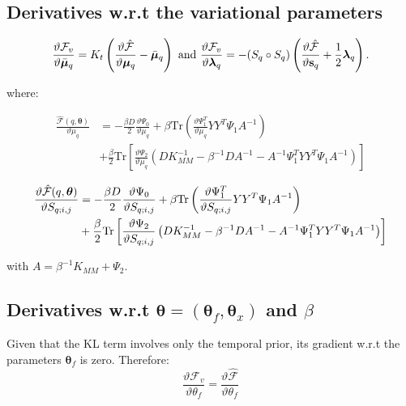 \subsection{Derivatives w.r.t the variational parameters}
\begin{equation}
    \label{derivVarParamSuppl}
\frac{\vartheta \mathcal{F}_v}{\vartheta \bar{\boldsymbol \mu}_q} 
=  K_t \left( \frac{\vartheta \hat{\mathcal{F}}}{\vartheta \boldsymbol \mu_q} - \bar{\boldsymbol \mu}_q \right)
\text{ and }
 \frac{\vartheta \mathcal{F}_v}{\vartheta \boldsymbol \lambda_q}
= - ( S_q \circ S_q) \left( \frac{\vartheta \hat{\mathcal{F}}}{\vartheta \mathbf{s}_q} + \frac{1}{2} \boldsymbol \lambda_q \right).
\end{equation}

where:

\begin{align}
 \frac{\hat{\mathcal{F}}(q, \boldsymbol \theta)}{\vartheta \mu_q}
{}& = - \frac{\beta D}{2} \frac{\vartheta \Psi_0}{\vartheta \mu_q}
    + \beta \text{Tr} \left(\frac{\vartheta \Psi_1^T}{\vartheta \mu_q} Y Y^T \Psi_1 A^{-1} \right) \nonumber \\
{}& + \frac{\beta}{2} \text{Tr} \left[ \frac{\vartheta \Psi_2}{\vartheta \mu_q}
       \left(
	  D K_{MM}^{-1} - \beta^{-1} D A^{-1} - A^{-1} \Psi_1^T Y Y^T \Psi_1 A^{-1}
       \right) \right] \label{derivFTildeEfficientComputationMu}
\end{align}


\begin{align}
 \frac{\vartheta \hat{\mathcal{F}}(q, \boldsymbol \theta)}{\vartheta S_{q;i,j}}
{}& = - \frac{\beta D}{2} \frac{\vartheta \Psi_0}{\vartheta S_{q;i,j}}
    + \beta \text{Tr} \left(\frac{\vartheta \Psi_1^T}{\vartheta S_{q;i,j}} Y Y^T \Psi_1 A^{-1} \right) \nonumber \\
{}& + \frac{\beta}{2} \text{Tr} \left[ \frac{\vartheta \Psi_2}{\vartheta S_{q;i,j}}
       \left(
	  D K_{MM}^{-1} - \beta^{-1} D A^{-1} - A^{-1} \Psi_1^T Y Y^T \Psi_1 A^{-1}
       \right) \right] \label{derivFTildeEfficientComputationS}
\end{align}


with $A=\beta^{-1}K_{MM}+\Psi_2$.





\subsection{Derivatives w.r.t $\boldsymbol \theta = (\boldsymbol \theta_f, \boldsymbol \theta_x)$ and $\beta$}
Given that the KL term involves only the temporal prior, its gradient w.r.t the parameters $\boldsymbol \theta_f$ is zero. Therefore:
\begin{equation}
   \label{DerivativeOfFComplete}
      \frac{\vartheta \mathcal{F}_v}{\vartheta \theta_f} = \frac{\vartheta \hat{\mathcal{F}}}{\vartheta \theta_f}
\end{equation}

